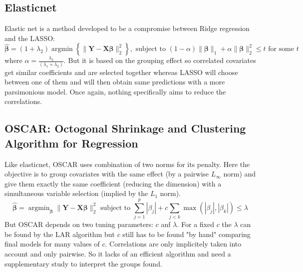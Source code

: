 \documentclass[11pt,a4paper]{report}
\begin{document}
		\subsection{Elasticnet}
			\cite{zou2005regularization}
			Elastic net \cite{zou2005regularization} is a method developed to be a compromise between Ridge regression and the \textsc{LASSO}: 
	\begin{equation}
		\boldsymbol{\hat{\beta}}=(1+\lambda_2) \operatorname{argmin}\left\lbrace \parallel \boldsymbol{Y}-\boldsymbol{X\beta} \parallel_2^2 \right\rbrace, \textrm{ subject to } (1-\alpha)\parallel\boldsymbol{\beta}\parallel_1+\alpha\parallel\boldsymbol{\beta}\parallel_2^2\leq t \textrm{ for some } t
	\end{equation}
	where $\alpha=\frac{\lambda_2}{(\lambda_1+\lambda_2)}$. 
	But it is based on the grouping effect so correlated covariates get similar coefficients and are selected together whereas LASSO will choose between one of them and will then obtain same predictions with a more parsimonious model. Once again, nothing specifically aims to reduce the correlations. %
		\subsection{OSCAR: Octogonal Shrinkage and Clustering Algorithm for Regression }
			Like elasticnet, \textsc{OSCAR} \cite{bondell2008simultaneous} uses combination of two norms for its penalty. Here the objective is to group covariates with the same effect (by a pairwise $L_\infty$ norm) and give them exactly the same coefficient (reducing the dimension) with a simultaneous variable selection (implied by the $L_1$ norm).
			\begin{equation}
				\hat{\boldsymbol{\beta}}=\operatorname{argmin}_{\boldsymbol{\beta}} \parallel\boldsymbol{Y}-\boldsymbol{X}\boldsymbol{\beta} \parallel^2_2 \textrm{ subject to } \sum_{j=1}^p|\beta_j|+c\sum_{j<k}\operatorname{max}(|\beta_j|,|\beta_k|) \leq \lambda		
			\end{equation}						
			But \textsc{OSCAR} depends on two tuning parameters: $c$ anf $\lambda$. For a fixed $c$ the $\lambda$ can be found by the \textsc{LAR} algorithm but $c$ still has to be found "by hand" comparing final models for many values of $c$.
			Correlations are only implicitely taken into account and only pairwise. So it lacks of an efficient algorithm and need a supplementary study to interpret the groups found.
\end{document}
